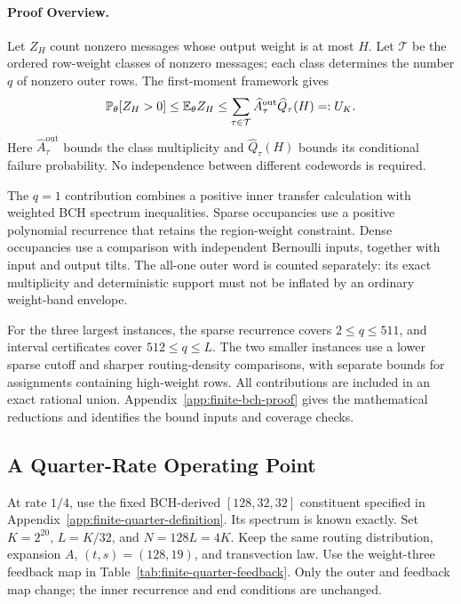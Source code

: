 \paragraph{Proof Overview.}
Let $Z_H$ count nonzero messages whose output weight is at most $H$.
Let $\mathcal T$ be the ordered row-weight classes of nonzero messages;
each class determines the number $q$ of nonzero outer rows.
The first-moment framework gives
\begin{equation}
  \mathbb P_\theta[Z_H>0]\le\mathbb E_\theta Z_H
  \le\sum_{\tau\in\mathcal T}
      \widehat A_\tau^{\mathrm{out}}\widehat Q_\tau(H)
  =:U_K.
  \label{eq:finite-certificate}
\end{equation}
Here $\widehat A_\tau^{\mathrm{out}}$ bounds the class multiplicity and
$\widehat Q_\tau(H)$ bounds its conditional failure probability.
No independence between different codewords is required.

The $q=1$ contribution combines a positive inner transfer calculation with
weighted BCH spectrum inequalities. Sparse occupancies use a positive
polynomial recurrence that retains the region-weight constraint. Dense
occupancies use a comparison with independent Bernoulli inputs, together
with input and output tilts. The all-one outer word is counted separately:
its exact multiplicity and deterministic support must not be inflated by an
ordinary weight-band envelope.

For the three largest instances, the sparse recurrence covers $2\le q\le511$,
and interval certificates cover $512\le q\le L$. The two smaller instances
use a lower sparse cutoff and sharper routing-density comparisons, with
separate bounds for assignments containing high-weight rows. All contributions are
included in an exact rational union. Appendix~\ref{app:finite-bch-proof}
gives the mathematical reductions and identifies the bound inputs and
coverage checks.

\subsection{A Quarter-Rate Operating Point}
\label{sec:finite-quarter}

At rate $1/4$, use the fixed BCH-derived $[128,32,32]$ constituent specified
in Appendix~\ref{app:finite-quarter-definition}. Its spectrum is known
exactly. Set $K=2^{20}$, $L=K/32$, and $N=128L=4K$. Keep the same
routing distribution, expansion $A$, $(t,s)=(128,19)$, and transvection
law. Use the weight-three feedback map in
Table~\ref{tab:finite-quarter-feedback}. Only the outer and feedback map
change; the inner recurrence and end conditions are unchanged.

